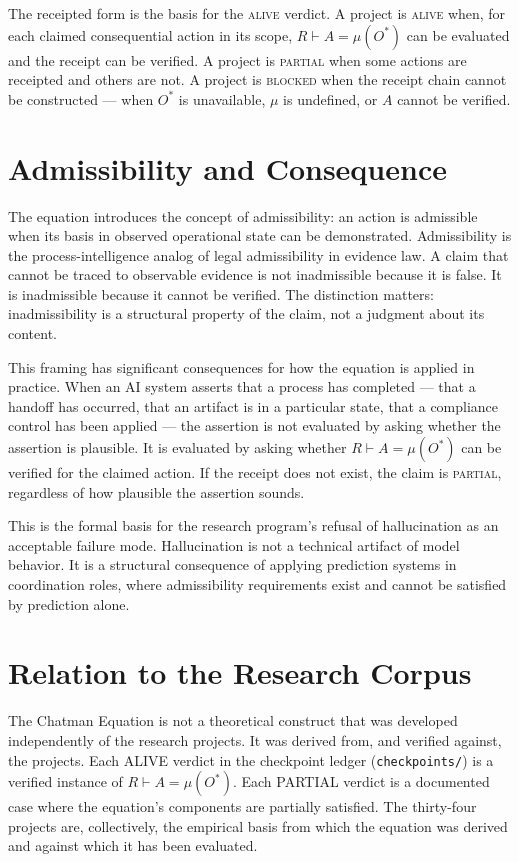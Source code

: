 The receipted form is the basis for the \textsc{alive} verdict. A project is \textsc{alive} when, for each claimed consequential action in its scope, $R \vdash A = \mu(O^{*})$ can be evaluated and the receipt can be verified. A project is \textsc{partial} when some actions are receipted and others are not. A project is \textsc{blocked} when the receipt chain cannot be constructed --- when $O^{*}$ is unavailable, $\mu$ is undefined, or $A$ cannot be verified.

\section{Admissibility and Consequence}

The equation introduces the concept of admissibility: an action is admissible when its basis in observed operational state can be demonstrated. Admissibility is the process-intelligence analog of legal admissibility in evidence law. A claim that cannot be traced to observable evidence is not inadmissible because it is false. It is inadmissible because it cannot be verified. The distinction matters: inadmissibility is a structural property of the claim, not a judgment about its content.

This framing has significant consequences for how the equation is applied in practice. When an AI system asserts that a process has completed --- that a handoff has occurred, that an artifact is in a particular state, that a compliance control has been applied --- the assertion is not evaluated by asking whether the assertion is plausible. It is evaluated by asking whether $R \vdash A = \mu(O^{*})$ can be verified for the claimed action. If the receipt does not exist, the claim is \textsc{partial}, regardless of how plausible the assertion sounds.

This is the formal basis for the research program's refusal of hallucination as an acceptable failure mode. Hallucination is not a technical artifact of model behavior. It is a structural consequence of applying prediction systems in coordination roles, where admissibility requirements exist and cannot be satisfied by prediction alone.

\section{Relation to the Research Corpus}

The Chatman Equation is not a theoretical construct that was developed independently of the research projects. It was derived from, and verified against, the projects. Each ALIVE verdict in the checkpoint ledger (\texttt{checkpoints/}) is a verified instance of $R \vdash A = \mu(O^{*})$. Each PARTIAL verdict is a documented case where the equation's components are partially satisfied. The thirty-four projects are, collectively, the empirical basis from which the equation was derived and against which it has been evaluated.

